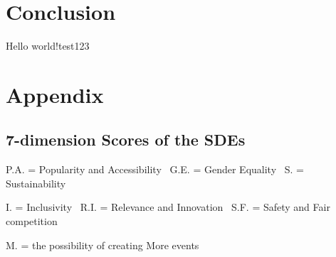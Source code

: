 \documentclass[a4paper]{article}
\begin{document}
\section{Conclusion}
Hello world!test123
\section{Appendix}
\subsection{7-dimension Scores of the SDEs}
P.A. = Popularity and Accessibility \ G.E. = Gender Equality \ S. = Sustainability

I. = Inclusivity \ R.I. = Relevance and Innovation \ S.F. = Safety and Fair competition

M. = the possibility of creating More events
\end{document}
